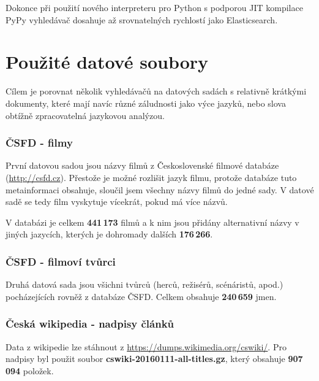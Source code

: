 \documentclass[12pt,letterpaper,oneside,openright]{book}
\begin{document}
Dokonce při použití nového interpreteru pro Python s podporou JIT
kompilace PyPy vyhledávač dosahuje až srovnatelných rychlostí jako
Elasticsearch.


\section{Použité datové soubory}
Cílem je porovnat několik vyhledávačů na datových sadách s relativně krátkými
dokumenty, které mají navíc různé záludnosti jako výce jazyků, nebo slova
obtížně zpracovatelná jazykovou analýzou.

\subsubsection{ČSFD - filmy}
První datovou sadou jsou názvy filmů z Československé filmové databáze
(\url{http://csfd.cz}). Přestože je možné rozlišit jazyk filmu, protože
databáze tuto metainformaci obsahuje, sloučil jsem všechny názvy filmů
do jedné sady. V datové sadě se tedy film vyskytuje vícekrát, pokud má
více názvů.

V databázi je celkem \textbf{441\,173} filmů a k nim jsou přidány
alternativní názvy v jiných jazycích, kterých je dohromady dalších
\textbf{176\,266}.

\subsubsection{ČSFD - filmoví tvůrci}
Druhá datová sada jsou všichni tvůrců (herců, režisérů, scénáristů,
apod.) pocházejících rovněž z databáze ČSFD. Celkem obsahuje
\textbf{240\,659} jmen.

\subsubsection{Česká wikipedia - nadpisy článků}
Data z wikipedie lze stáhnout z \url{https://dumps.wikimedia.org/cswiki/}. Pro
nadpisy byl použit soubor \textbf{cswiki-20160111-all-titles.gz}, který
obsahuje \textbf{907\,094} položek.
\end{document}
